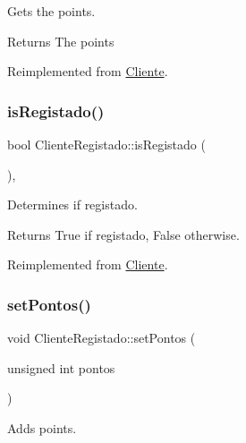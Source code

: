 Gets the points. 

\begin{DoxyReturn}{Returns}
The points 
\end{DoxyReturn}


Reimplemented from \hyperlink{classCliente_a4bcd51f0d9a0bfe7d9d47074ac4e65de}{Cliente}.

\mbox{\label{classClienteRegistado_a3dade20423acb0e84c9fbe30c75f0e3e}} 
\subsubsection{\texorpdfstring{is\+Registado()}{isRegistado()}}
{\footnotesize\ttfamily bool Cliente\+Registado\+::is\+Registado (\begin{DoxyParamCaption}{ }\end{DoxyParamCaption})\hspace{0.3cm}{\ttfamily [inline]}, {\ttfamily [virtual]}}



Determines if registado. 

\begin{DoxyReturn}{Returns}
True if registado, False otherwise. 
\end{DoxyReturn}


Reimplemented from \hyperlink{classCliente_acb60d8bf04134b986ae56a79db8beaaf}{Cliente}.

\mbox{\label{classClienteRegistado_a93d79ba4ecd6716124c832fc2f38ddc5}} 
\subsubsection{\texorpdfstring{set\+Pontos()}{setPontos()}}
{\footnotesize\ttfamily void Cliente\+Registado\+::set\+Pontos (\begin{DoxyParamCaption}\item[{unsigned int}]{pontos }\end{DoxyParamCaption})\hspace{0.3cm}{\ttfamily [virtual]}}



Adds points. 


